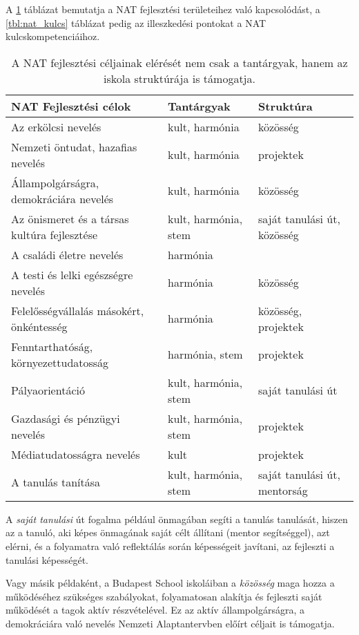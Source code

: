 A \ref{tbl:nat_fejlesztesi} táblázat bemutatja a NAT fejlesztési területeihez való kapcsolódást, a
\ref{tbl:nat_kulcs} táblázat pedig az illeszkedési pontokat a NAT kulcskompetenciáihoz.

\begin{table}

  \begin{tabular}{p{5cm}|>{\raggedright}p{3cm}|p{3cm}}


    \textbf{NAT Fejlesztési célok} & \textbf{Tantárgyak} & \textbf{Struktúra}\\ \hline
Az erkölcsi nevelés & kult, harmónia & közösség\\ \hline
Nemzeti öntudat, hazafias nevelés & kult, harmónia & projektek\\ \hline
Állampolgárságra, demokráciára nevelés & kult, harmónia & közösség\\ \hline
Az önismeret és a társas kultúra fejlesztése & kult, harmónia, stem & saját tanulási út, közösség\\ \hline
A családi életre nevelés & harmónia &  \\ \hline
A testi és lelki egészségre nevelés & harmónia & közösség\\ \hline
Felelősségvállalás másokért, önkéntesség & harmónia & közösség, projektek\\ \hline
Fenntarthatóság, környezettudatosság & harmónia, stem & projektek\\ \hline
Pályaorientáció & kult, harmónia, stem & saját tanulási út\\ \hline
Gazdasági és pénzügyi nevelés & kult, harmónia, stem & projektek\\ \hline
Médiatudatosságra nevelés & kult & projektek\\ \hline
A tanulás tanítása & kult, harmónia, stem & saját tanulási út, mentorság\\

  \end{tabular}
  \caption{A NAT fejlesztési céljainak elérését nem csak a tantárgyak, hanem az iskola struktúrája is támogatja.}
  \label{tbl:nat_fejlesztesi}
\end{table}


A \emph{saját tanulási} út fogalma például önmagában segíti a tanulás tanulását, hiszen az a tanuló, aki képes önmagának saját célt állítani (mentor segítséggel), azt elérni, és a folyamatra való reflektálás során képességeit javítani, az fejleszti a tanulási képességét.

Vagy másik példaként, a Budapest School iskoláiban a \emph{közösség} maga hozza a működéséhez szükséges szabályokat, folyamatosan alakítja és fejleszti saját működését a tagok aktív részvételével. Ez az aktív állampolgárságra, a demokráciára való nevelés Nemzeti Alaptantervben előírt céljait is támogatja.


